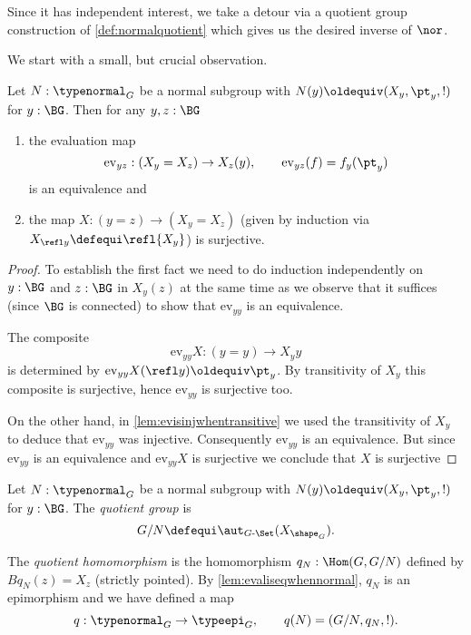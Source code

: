 Since it has independent interest, we take a detour via a quotient group construction of \cref{def:normalquotient} which gives us the desired inverse of $\nor$.

We start with a small, but crucial observation.
\begin{lemma}
  \label{lem:evaliseqwhennormal}
  Let $N:\typenormal_G$ be a normal subgroup with $N(y)\oldequiv (X_y,\pt_y,!)$ for $y:\BG$.
  Then for any $y,z:\BG$
  \begin{enumerate}
  \item the evaluation map
$$\mathrm{ev}_{yz}:(X_y=X_z)\to X_z(y),\qquad \mathrm{ev}_{yz}(f)=f_y(\pt_y)$$
is an equivalence and
  \item  the map $X:(y=z)\to(X_y=X_z)$ (given by induction via $X_{\refl y}\defequi\refl{X_y}$) is surjective.
  \end{enumerate}
\end{lemma}
\begin{proof}
To establish the first fact we need to do induction independently on $y:\BG$ and $z:\BG$ in $X_y(z)$ at the same time as we observe that it suffices (since $\BG$ is connected) to show that $\mathrm{ev}_{yy}$ is an equivalence.

The composite
$$\mathrm{ev}_{yy}X:(y=y)\to X_yy$$ is determined by $\mathrm{ev}_{yy}X(\refl y)\oldequiv \pt_y$.
By transitivity of $X_y$ this composite is surjective, hence $\mathrm{ev}_{yy}$ is surjective too.

On the other hand, in  \cref{lem:evisinjwhentransitive} we used the transitivity of $X_y$ to deduce that $\mathrm{ev}_{yy}$ was injective.  Consequently $\mathrm{ev}_{yy}$ is an equivalence.  But since $\mathrm{ev}_{yy}$ is an equivalence and $\mathrm{ev}_{yy}X$ is surjective we conclude that $X$ is surjective
\end{proof}
\begin{definition}
\label{def:normalquotient}
Let $N:\typenormal_G$ be a normal subgroup with $N(y)\oldequiv (X_y,\pt_y,!)$ for $y:\BG$.  The \emph{quotient group} is
$$G/N\defequi\aut_{G\text{-}\Set}(X_{\shape_G}).
$$

The \emph{quotient homomorphism} is the homomorphism $q_N:\Hom(G,G/N)$  defined by $Bq_N(z)=X_z$ (strictly pointed).
By \cref{lem:evaliseqwhennormal}, $q_N$ is an epimorphism and we have defined a map
$$q:\typenormal_G\to\typeepi_G,\qquad q(N)=(G/N,q_N,!).$$
\end{definition}

